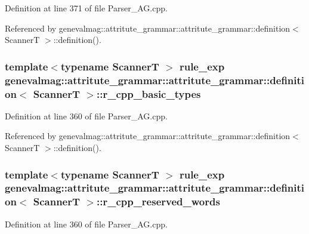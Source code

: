 Definition at line 371 of file Parser\_\-AG.cpp.

Referenced by genevalmag::attritute\_\-grammar::attritute\_\-grammar::definition$<$ ScannerT $>$::definition().\hypertarget{structgenevalmag_1_1attritute__grammar_1_1definition_c504d0b589c4a10e01ab7acc722ecd26}{
\subsubsection[{r\_\-cpp\_\-basic\_\-types}]{\setlength{\rightskip}{0pt plus 5cm}template$<$typename ScannerT $>$ {\bf rule\_\-exp} genevalmag::attritute\_\-grammar::attritute\_\-grammar::definition$<$ ScannerT $>$::{\bf r\_\-cpp\_\-basic\_\-types}}}
\label{structgenevalmag_1_1attritute__grammar_1_1definition_c504d0b589c4a10e01ab7acc722ecd26}




Definition at line 360 of file Parser\_\-AG.cpp.

Referenced by genevalmag::attritute\_\-grammar::attritute\_\-grammar::definition$<$ ScannerT $>$::definition().\hypertarget{structgenevalmag_1_1attritute__grammar_1_1definition_129ff82a9e140910627867c0a1dd61d0}{
\subsubsection[{r\_\-cpp\_\-reserved\_\-words}]{\setlength{\rightskip}{0pt plus 5cm}template$<$typename ScannerT $>$ {\bf rule\_\-exp} genevalmag::attritute\_\-grammar::attritute\_\-grammar::definition$<$ ScannerT $>$::{\bf r\_\-cpp\_\-reserved\_\-words}}}
\label{structgenevalmag_1_1attritute__grammar_1_1definition_129ff82a9e140910627867c0a1dd61d0}




Definition at line 360 of file Parser\_\-AG.cpp.

